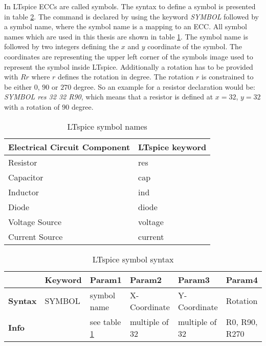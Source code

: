 In LTspice \acp{ECC} are called symbols.
The syntax to define a symbol is presented in table \ref{tab:ltsymbol_syntax}.
The command is declared by using the keyword \textit{SYMBOL} followed by a symbol name, where the symbol name is a mapping to an \ac{ECC}.
All symbol names which are used in this thesis are shown in table \ref{tab:ltsymbol_mapping}.
The symbol name is followed by two integers defining the $x$ and $y$ coordinate of the symbol.
The coordinates are representing the upper left corner of the symbols image used to represent the symbol inside LTspice.
Additionally a rotation has to be provided with $Rr$ where $r$ defines the rotation in degree.
The rotation $r$ is constrained to be either $0$, $90$ or $270$ degree.
So an example for a resistor declaration would be: \textit{SYMBOL res 32 32 R90}, which means that a resistor is defined at $x = 32$, $y = 32$ with a rotation of $90$ degree.

\begin{table}[H]
\begin{center}

\begin{tabular}{l|l}
    \textbf{Electrical Circuit Component} & \textbf{LTspice keyword}\\
    \hline
    Resistor & res\\
    Capacitor & cap\\
    Inductor & ind\\
    Diode & diode\\
    Voltage Source & voltage\\
    Current Source & current
\end{tabular}
\caption{LTspice symbol names}
\label{tab:ltsymbol_mapping}

\end{center}
\end{table}

\begin{table}[H]
\begin{center}

\begin{tabular}{l|l|l|l|l|l}
    & \textbf{Keyword} & \textbf{Param1} & \textbf{Param2} & \textbf{Param3} & \textbf{Param4}\\
    \hline
    \textbf{Syntax} & SYMBOL & symbol name & X-Coordinate & Y-Coordinate & Rotation\\
    \textbf{Info} & & see table \ref{tab:ltsymbol_mapping} & multiple of 32 & multiple of 32 & R0, R90, R270
\end{tabular}
\caption{LTspice symbol syntax}
\label{tab:ltsymbol_syntax}

\end{center}
\end{table}

